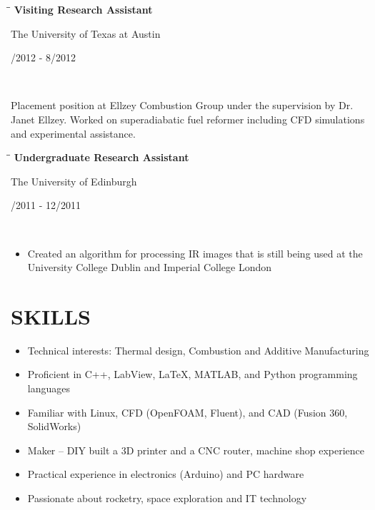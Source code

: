 \documentclass[11pt]{res}
\begin{document}
\begin{resume}
{   \begin{tabbing}%
   \hspace{2.7in}\= \hspace{2.3in}\= \kill %
   {\bf Visiting Research Assistant}  \> \parbox[c]{6cm}{ \centering The University of Texas at Austin } \> \parbox[c]{3.8cm}{ /2012 - 8/2012}\\
   \end{tabbing}\vspace{-30pt}
	Placement position at Ellzey Combustion Group under the supervision by Dr. Janet Ellzey. Worked on superadiabatic fuel reformer including CFD simulations and experimental assistance.
 \vspace{-9pt}
}
   
 \vspace{-18pt}
   \begin{tabbing}
   \hspace{2.7in}\= \hspace{2.3in}\= \kill %
    {\bf Undergraduate Research Assistant} \> \parbox[c]{6cm}{ \centering The University of Edinburgh} \> \parbox[c]{3.8cm}{ /2011 - 12/2011}\\
   \end{tabbing}
   \vspace{-22pt}
   
    \begin{itemize}
   	\setlength{\leftmargin}{-10pt} \setlength\itemsep{0pt}
   	\item Created an algorithm for processing IR images that is still being used at the University College Dublin and Imperial College London
   	\end{itemize}
 \vspace{-10pt}

\vspace{-10pt}           
\section{SKILLS}   
	\begin{itemize}
   	\setlength{\leftmargin}{-10pt} \setlength\itemsep{0pt}
	\item Technical interests: Thermal design, Combustion and Additive Manufacturing
	\item Proficient in C++, LabView, LaTeX, MATLAB, and Python programming languages
	\item Familiar with Linux, CFD (OpenFOAM, Fluent), and CAD (Fusion 360, SolidWorks)
	\item Maker  {}-- DIY built a 3D printer and a CNC router, machine shop experience
	\item Practical experience in electronics (Arduino) and PC hardware
	\item Passionate about rocketry, space exploration and IT technology
	\end{itemize}


\end{resume}
\end{document}
